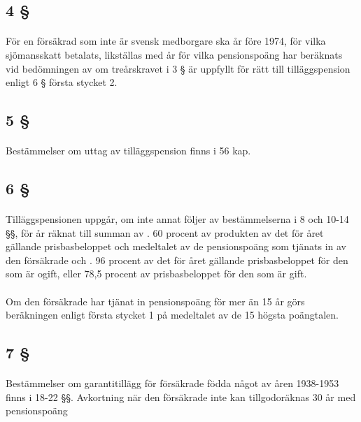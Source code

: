 \documentclass[a4paper,notitlepage,openany,10pt]{book}
\begin{document}
\subsection*{4 §}
\paragraph*{}
För en försäkrad som inte är svensk medborgare ska år före 1974, för vilka sjömansskatt betalats, likställas med år för vilka pensionspoäng har beräknats vid bedömningen av om treårskravet i 3 § är uppfyllt för rätt till tilläggspension enligt 6 § första stycket 2.
\subsection*{5 §}
\paragraph*{}
Bestämmelser om uttag av tilläggspension finns i 56 kap.
\subsection*{6 §}
\paragraph*{}
Tilläggspensionen uppgår, om inte annat följer av bestämmelserna i 8 och 10-14 §§, för år räknat till summan av
. 60 procent av produkten av det för året gällande prisbasbeloppet och medeltalet av de pensionspoäng som tjänats in av den försäkrade och
. 96 procent av det för året gällande prisbasbeloppet för den som är ogift, eller 78,5 procent av prisbasbeloppet för den som är gift.
\paragraph*{}
Om den försäkrade har tjänat in pensionspoäng för mer än 15 år görs beräkningen enligt första stycket 1 på medeltalet av de 15 högsta poängtalen.
\subsection*{7 §}
\paragraph*{}
Bestämmelser om garantitillägg för försäkrade födda något av åren 1938-1953 finns i 18-22 §§.
Avkortning när den försäkrade inte kan tillgodoräknas 30 år med pensionspoäng
\end{document}

